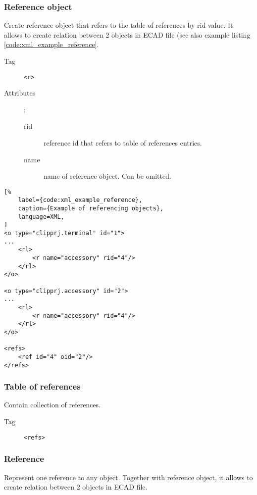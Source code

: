 \documentclass[%
	a4paper,
	oneside,
	listof=numbered,
	parskip=half,
	headsepline=true,
	footsepline=false,
	normalheadings,
	0.7headlines,
	headexclude,
	]{scrbook}
\begin{document}
\subsubsection{Reference object}

Create reference object that refers to the table of references by rid value. It allows to create relation between 2 objects in ECAD file (see also example listing \ref{code:xml_example_reference}.

\begin{description}
	\item[Tag] \verb|<r>|
	\item[Attributes]:
	
	\begin{description}
		\item[rid] reference id that refers to table of references entries.
		\item[name] name of reference object. Can be omitted.
	\end{description}
\end{description}

\begin{lstlisting}[%
	label={code:xml_example_reference},
	caption={Example of referencing objects},
	language=XML,
]
<o type="clipprj.terminal" id="1">
...
	<rl>
		<r name="accessory" rid="4"/>
	</rl>
</o>

<o type="clipprj.accessory" id="2">
...
	<rl>
		<r name="accessory" rid="4"/>
	</rl>
</o>

<refs>
	<ref id="4" oid="2"/>
</refs>
\end{lstlisting}

\subsubsection{Table of references}

Contain collection of references.

\begin{description}
	\item[Tag] \verb|<refs>|
\end{description}

\subsubsection{Reference}

Represent one reference to any object. Together with reference object, it allows to create relation between 2 objects in ECAD file.
\end{document}
